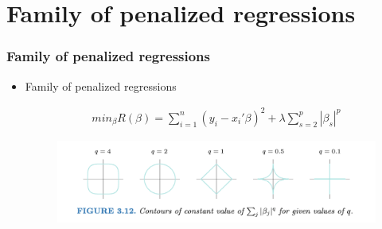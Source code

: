 \documentclass[
  shownotes,
  xcolor={svgnames},
  hyperref={colorlinks,citecolor=DarkBlue,linkcolor=DarkRed,urlcolor=DarkBlue}
  , aspectratio=169]{beamer}
\begin{document}
\section{Family of penalized regressions}
\begin{frame}[fragile]
\frametitle{Family of penalized regressions}

\begin{itemize}
\item Family of penalized regressions

\begin{align}
min_{\beta} R(\beta) = \sum_{i=1}^n (y_i-x_i'\beta)^2 + \lambda \sum_{s=2}^p |\beta_s|^p
\end{align}

 \begin{figure}[H] \centering
            \captionsetup{justification=centering}
              \includegraphics[scale=0.4]{figures/penalties.png}
 \end{figure}
\end{itemize}
\end{frame}
\end{document}
